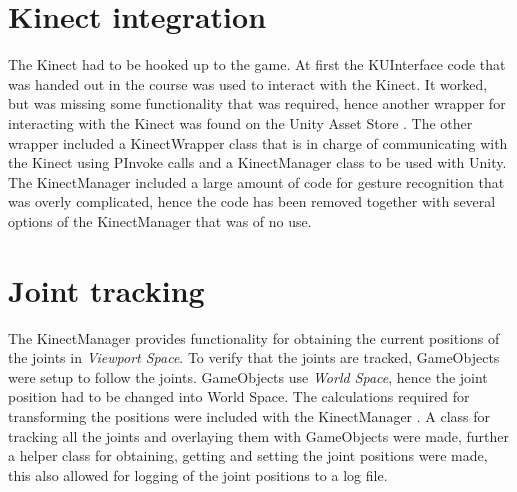 \documentclass[11pt]{report}
\begin{document}
\section{Kinect integration}
The Kinect had to be hooked up to the game. At first the KUInterface code that was handed out in the course was used to interact with the Kinect. It worked, but was missing some functionality that was required, hence another wrapper for interacting with the Kinect was found on the Unity Asset Store \cite{assetstorekinect}. The other wrapper included a KinectWrapper class that is in charge of communicating with the Kinect using PInvoke calls and a KinectManager class to be used with Unity. The KinectManager included a large amount of code for gesture recognition that was overly complicated, hence the code has been removed together with several options of the KinectManager that was of no use.

\section{Joint tracking}
The KinectManager provides functionality for obtaining the current positions of the joints in \emph{Viewport Space}. To verify that the joints are tracked, GameObjects were setup to follow the joints. GameObjects use \emph{World Space}, hence the joint position had to be changed into World Space. The calculations required for transforming the positions were included with the KinectManager \cite{assetstorekinect}. A class for tracking all the joints and overlaying them with GameObjects were made, further a helper class for obtaining, getting and setting the joint positions were made, this also allowed for logging of the joint positions to a log file.
\end{document}
